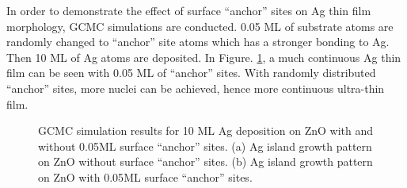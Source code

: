 In order to demonstrate the effect of surface ``anchor'' sites on Ag thin film morphology, \ac{GCMC} simulations are conducted. 0.05 \ac{ML} of substrate atoms are randomly changed to ``anchor'' site atoms which has a stronger bonding to Ag. Then 10 \ac{ML} of Ag atoms are deposited. In Figure. \ref{Chap:Ag/ZnO:fig14}, a much continuous Ag thin film can be seen with 0.05 \ac{ML} of ``anchor'' sites. With randomly distributed ``anchor'' sites, more nuclei can be achieved, hence more continuous ultra-thin film.

\begingroup
\begin{figure}[!ht]
  \centering
  \label{Chap:Ag/ZnO:fig:14a}
  \label{Chap:Ag/ZnO:fig:14b}
\caption[GCMC simulation results for 10 \ac{ML} Ag deposition on ZnO with and without 0.05\ac{ML} surface ``anchor'' sites.]{\ac{GCMC} simulation results for 10 \ac{ML} Ag deposition on ZnO with and without 0.05\ac{ML} surface ``anchor'' sites. (a) Ag island growth pattern on ZnO without surface ``anchor'' sites. (b) Ag island growth pattern on ZnO with 0.05\ac{ML} surface ``anchor'' sites.}
\label{Chap:Ag/ZnO:fig14}
\end{figure}
\endgroup